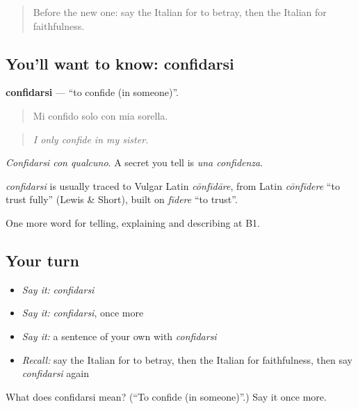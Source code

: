 \label{lesson:IT-C499-confidarsi}



\begin{quote}
Before the new one: say the Italian for to betray, then the Italian for faithfulness.
\end{quote}

\subsection*{You'll want to know: confidarsi}
\textbf{confidarsi} — \textquotedblleft{}to confide (in someone)\textquotedblright{}.

\begin{quote}
Mi confido solo con mia sorella.
\end{quote}

\begin{quote}
\emph{I only confide in my sister.}
\end{quote}

\emph{Confidarsi con qualcuno}. A secret you tell is \emph{una confidenza}.

\begin{cousinweb}
\emph{confidarsi} is usually traced to Vulgar Latin \emph{cōnfīdāre}, from Latin \emph{cōnfīdere} \textquotedblleft{}to trust fully\textquotedblright{} (Lewis \& Short), built on \emph{fīdere} \textquotedblleft{}to trust\textquotedblright{}.
\end{cousinweb}

\begin{grammarlens}[title={What you've built}]
One more word for telling, explaining and describing at B1.
\end{grammarlens}

\subsection*{Your turn}
\begin{itemize}
\raggedright
  \item \emph{Say it:} \emph{confidarsi}
  \item \emph{Say it:} \emph{confidarsi}, once more
  \item \emph{Say it:} a sentence of your own with \emph{confidarsi}
  \item \emph{Recall:} say the Italian for to betray, then the Italian for faithfulness, then say \emph{confidarsi} again
\end{itemize}

\begin{tcolorbox}[breakable,colback=teal!4,colframe=teal!35!black,title={Before you move on}]
What does confidarsi mean? (\textquotedblleft{}To confide (in someone)\textquotedblright{}.) Say it once more.
\end{tcolorbox}
